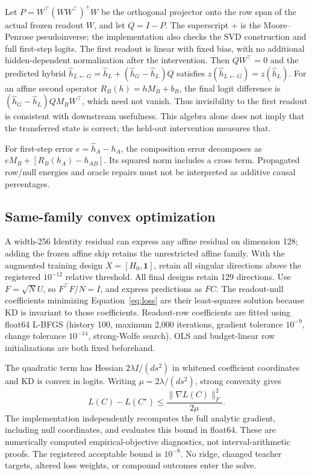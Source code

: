 Let $P=W^\top(WW^\top)^+W$ be the orthogonal projector onto the row span of the actual frozen readout $W$, and let $Q=I-P$. The superscript $+$ is the Moore--Penrose pseudoinverse; the implementation also checks the SVD construction and full first-step logits. The first readout is linear with fixed bias, with no additional hidden-dependent normalization after the intervention.
Then $QW^\top=0$ and the predicted hybrid
$\hat h_{L\leftarrow G}=\hat h_L+(\hat h_G-\hat h_L)Q$
satisfies $z(\hat h_{L\leftarrow G})=z(\hat h_L)$.
For an affine second operator $R_B(h)=hM_B+b_B$, the final logit difference is
$(\hat h_G-\hat h_L)QM_BW^\top$, which need not vanish.
Thus invisibility to the first readout is consistent with downstream usefulness.
This algebra alone does not imply that the transferred state is correct; the held-out intervention measures that.

For first-step error $e=\hat h_A-h_A$, the composition error decomposes as
$eM_B+[R_B(h_A)-h_{AB}]$.
Its squared norm includes a cross term. Propagated row/null energies and oracle repairs must not be interpreted as additive causal percentages.

\subsection{Same-family convex optimization}\label{app:convergence}
A width-256 Identity residual can express any affine residual on dimension 128; adding the frozen affine skip retains the unrestricted affine family.
With the augmented training design $X=[H_0,\mathbf{1}]$, retain all singular directions above the registered $10^{-12}$ relative threshold.
All final designs retain 129 directions.
Use $F=\sqrt{N}U$, so $F^\top F/N=I$, and express predictions as $FC$.
The readout-null coefficients minimizing Equation~\ref{eq:loss} are their least-squares solution because KD is invariant to those coefficients.
Readout-row coefficients are fitted using float64 L-BFGS (history 100, maximum 2,000 iterations, gradient tolerance $10^{-9}$, change tolerance $10^{-14}$, strong-Wolfe search).
OLS and budget-linear row initializations are both fixed beforehand.

The quadratic term has Hessian $2\lambda I/(ds^2)$ in whitened coefficient coordinates and KD is convex in logits.
Writing $\mu=2\lambda/(ds^2)$, strong convexity gives
\[
 L(C)-L(C^\star)\leq\frac{\|\nabla L(C)\|_F^2}{2\mu}.
\]
The implementation independently recomputes the full analytic gradient, including null coordinates, and evaluates this bound in float64.
These are numerically computed empirical-objective diagnostics, not interval-arithmetic proofs.
The registered acceptable bound is $10^{-8}$.
No ridge, changed teacher targets, altered loss weights, or compound outcomes enter the solve.

